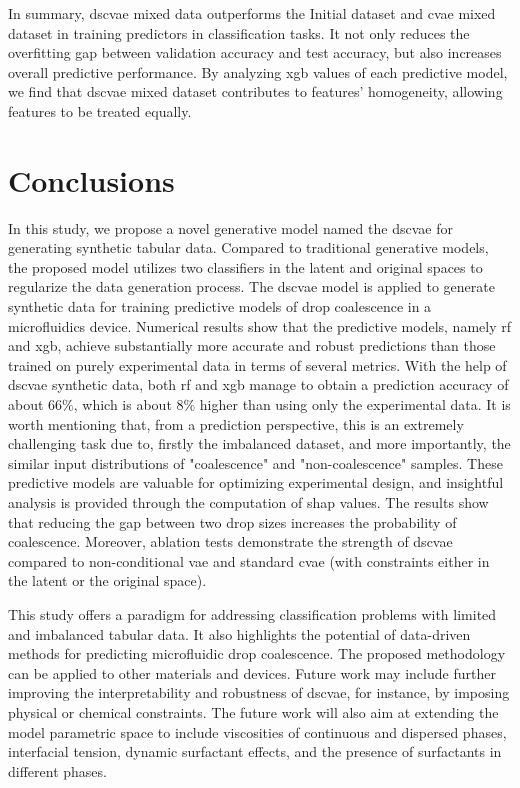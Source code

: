 \documentclass[twoside,twocolumn,9pt]{article}
\begin{document}
In summary, \acrshort*{dscvae} mixed data outperforms the Initial dataset and \acrshort*{cvae} mixed dataset in training predictors in classification tasks. It not only reduces the overfitting gap between validation accuracy and test accuracy, but also increases overall predictive performance. By analyzing \acrlong*{xgb} values of each predictive model, we find that \acrshort*{dscvae} mixed dataset contributes to features' homogeneity, allowing features to be treated equally. 

\section{Conclusions}
In this study,  we propose a novel generative model named the \acrfull*{dscvae} for generating synthetic tabular data. Compared to traditional generative models, the proposed model utilizes two classifiers in the latent and original spaces to regularize the data generation process. The \acrshort*{dscvae} model is applied to generate synthetic data for training predictive models of drop coalescence in a microfluidics device. Numerical results show that the predictive models, namely \acrshort*{rf} and \acrlong*{xgb}, achieve substantially more accurate and robust predictions than those trained on purely experimental data in terms of several metrics. With the help of \acrshort*{dscvae} synthetic data, both \acrshort*{rf} and \acrlong*{xgb} manage to obtain a prediction accuracy of about $66\%$, which is about $8\%$ higher than using only the experimental data. It is worth mentioning that, from a prediction perspective, this is an extremely challenging task due to, firstly the imbalanced dataset, and more importantly, the similar input distributions of "coalescence" and "non-coalescence" samples. 
These predictive models are valuable for optimizing experimental design, and insightful analysis is provided through the computation of \acrfull*{shap} values.  The results show that reducing the gap between two drop sizes increases the probability of coalescence. Moreover, ablation tests demonstrate the strength of \acrshort*{dscvae} compared to non-conditional \acrshort*{vae} and standard \acrshort*{cvae} (with constraints either in the latent or the original space). 

This study offers a paradigm for addressing classification problems with limited and imbalanced tabular data. It also highlights the potential of data-driven methods for predicting microfluidic drop coalescence. The proposed methodology can be applied to other materials and devices. Future work may include further improving the interpretability and robustness of \acrshort*{dscvae}, for instance, by imposing physical or chemical constraints. The future work will also aim at extending the model parametric space to include viscosities of continuous and dispersed phases, interfacial tension, dynamic surfactant effects, and the presence of surfactants in different phases. 
\end{document}
